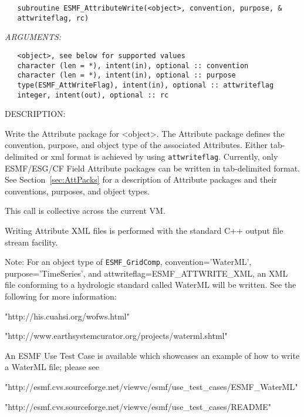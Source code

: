 \begin{verbatim}   subroutine ESMF_AttributeWrite(<object>, convention, purpose, &
   attwriteflag, rc)\end{verbatim}{\em ARGUMENTS:}
\begin{verbatim}   <object>, see below for supported values
   character (len = *), intent(in), optional :: convention
   character (len = *), intent(in), optional :: purpose
   type(ESMF_AttWriteFlag), intent(in), optional :: attwriteflag
   integer, intent(out), optional :: rc\end{verbatim}
{\sf DESCRIPTION:\\ }


   Write the Attribute package for <object>. The Attribute package defines
   the convention, purpose, and object type of the associated Attributes. Either
   tab-delimited or xml format is achieved by using {\tt attwriteflag}.
   Currently, only ESMF/ESG/CF Field Attribute packages can be written in
   tab-delimited format. See Section~\ref{sec:AttPacks} for a description
   of Attribute packages and their conventions, purposes, and object types.
  
   This call is collective across the current VM.
  
   Writing Attribute XML files is performed with the standard C++ output
   file stream facility.
  
   Note: For an object type of {\tt ESMF\_GridComp}, convention='WaterML',
   purpose='TimeSeries', and
   \newline
   attwriteflag=ESMF\_ATTWRITE\_XML, an XML file
   conforming to a hydrologic standard called WaterML will be written. See
   the following for more information:
  
   \begin{description}
   \item{"http://his.cuahsi.org/wofws.html"}
   \item{"http://www.earthsystemcurator.org/projects/waterml.shtml"}
   \end{description}
  
   An ESMF Use Test Case is available which showcases an example of how
   to write a WaterML file; please see
  
   \begin{description}
   \item{"http://esmf.cvs.sourceforge.net/viewvc/esmf/use\_test\_cases/ESMF\_WaterML"}
   \item{"http://esmf.cvs.sourceforge.net/viewvc/esmf/use\_test\_cases/README"}
   \end{description}
  
